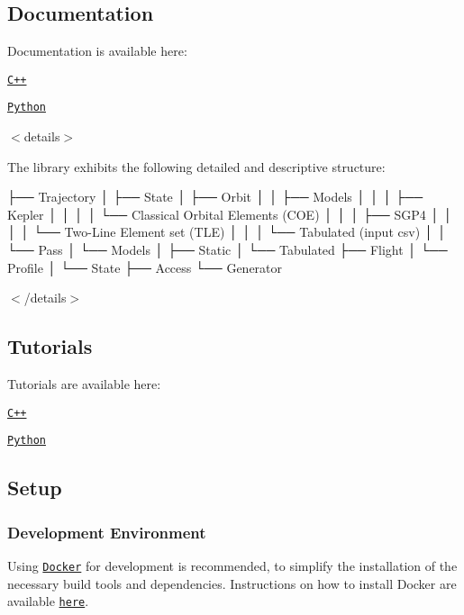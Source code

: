 \subsection*{Documentation}

Documentation is available here\+:


\begin{DoxyItemize}
\item \href{https://open-space-collective.github.io/open-space-toolkit-astrodynamics}{\tt C++}
\item \href{./bindings/python/docs}{\tt Python}
\end{DoxyItemize}

$<$details$>$

The library exhibits the following detailed and descriptive structure\+:


\begin{DoxyCode}
├── Trajectory
│   ├── State
│   ├── Orbit
│   │   ├── Models
│   │   │   ├── Kepler
│   │   │   │   └── Classical Orbital Elements (COE)
│   │   │   ├── SGP4
│   │   │   │   └── Two-Line Element \textcolor{keyword}{set} (TLE)
│   │   │   └── Tabulated (input csv)
│   │   └── Pass
│   └── Models
│       ├── Static
│       └── Tabulated
├── Flight
│   └── Profile
│       └── State
├── Access
        └── Generator
\end{DoxyCode}


$<$/details$>$

\subsection*{Tutorials}

Tutorials are available here\+:


\begin{DoxyItemize}
\item \href{./tutorials/cpp}{\tt C++}
\item \href{./tutorials/python}{\tt Python}
\end{DoxyItemize}

\subsection*{Setup}

\subsubsection*{Development Environment}

Using \href{https://www.docker.com}{\tt Docker} for development is recommended, to simplify the installation of the necessary build tools and dependencies. Instructions on how to install Docker are available \href{https://docs.docker.com/install/}{\tt here}.

